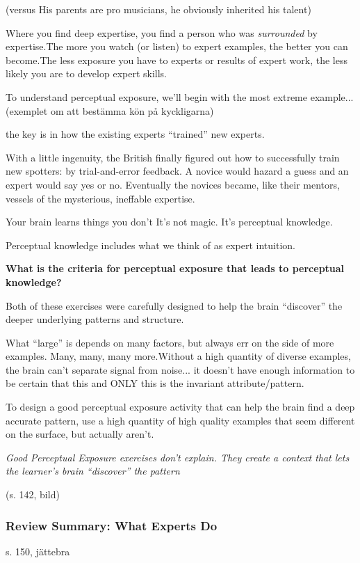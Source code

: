 (versus His parents are pro musicians, he obviously inherited his talent)

Where you find deep expertise, you find a person who was \textit{surrounded} by expertise.The more you watch (or listen) to expert examples, the better you can become.The less exposure you have to experts or results of expert work, the less likely you are to develop expert skills.

To understand perceptual exposure, we’ll begin with the most extreme example... (exemplet om att bestämma kön på kyckligarna)

the key is in how the existing experts “trained” new experts.

With a little ingenuity, the British finally figured out how to successfully train new spotters: by trial-and-error feedback. A novice would hazard a guess and an expert would say yes or no. Eventually the novices became, like their mentors, vessels of the mysterious, ineffable expertise.

Your brain learns things you don’t
It’s not magic.
It’s perceptual knowledge.

Perceptual knowledge includes what we think of as expert intuition.

\textbf{What is the criteria for perceptual exposure that leads to perceptual knowledge?}

Both of these exercises were carefully designed to help the brain “discover” the deeper underlying patterns and structure.

What “large” is depends on many factors, but always err on the side of more examples. Many, many, many more.Without a high quantity of diverse examples, the brain can’t separate signal from noise... it doesn’t have enough information to be certain that this and ONLY this is the invariant attribute/pattern.

To design a good perceptual exposure activity that can help the brain find a deep accurate pattern, use a high quantity of high quality examples that seem different on the surface, but actually aren’t.

\textit{Good Perceptual Exposure exercises don’t explain. They create a context that lets the learner’s brain “discover” the pattern}

(s. 142, bild)

\subsubsection{Review Summary: What Experts Do}
s. 150, jättebra

